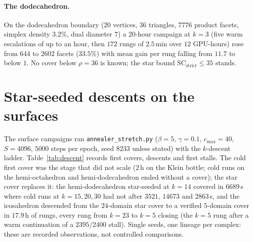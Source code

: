 \documentclass[12pt]{article}
\newcommand{\SC}{\mathrm{SC}}
\newcommand{\SCst}{\SC_{\mathrm{strict}}}
\begin{document}
\paragraph{The dodecahedron.}  On the dodecahedron boundary ($20$
vertices, $36$ triangles, $7776$ product facets, simplex density $3.2\%$,
dual diameter $7$) a $20$-hour campaign at $k=3$ (five warm escalations of
up to an hour, then $172$ rungs of $2.5$\,min over $12$ GPU-hours) rose from
$644$ to $2602$ facets ($33.5\%$) with mean gain per rung falling from $11.7$
to below $1$.  No cover below $\rho=36$ is known; the star bound $\SCst\le35$
stands.

\section{Star-seeded descents on the surfaces}\label{sec:descent}

The surface campaigns ran \texttt{annealer\_stretch.py} ($\beta=5$,
$\gamma=0.1$, $c_{\max}=40$, $S=4096$, $5000$ steps per epoch, seed $8233$
unless stated) with the $k$-descent ladder.  Table~\ref{tab:descent} records
first covers, descents and first stalls.  The cold first cover was the stage
that did not scale ($2$\,h on the Klein bottle; cold runs on the
hemi-octahedron and hemi-dodecahedron ended without a cover); the star cover
replaces it: the hemi-dodecahedron star-seeded at $k=14$ covered in
$6689$\,s where cold runs at $k=15,20,30$ had not after $3521$, $14673$ and
$2863$\,s, and the icosahedron descended from the $24$-domain star cover to a
verified $5$-domain cover in $17.9$\,h of rungs, every rung from $k=23$ to
$k=5$ closing (the $k=5$ rung after a warm continuation of a $2395/2400$
stall).  Single seeds, one lineage per complex: these are recorded
observations, not controlled comparisons.
\end{document}
